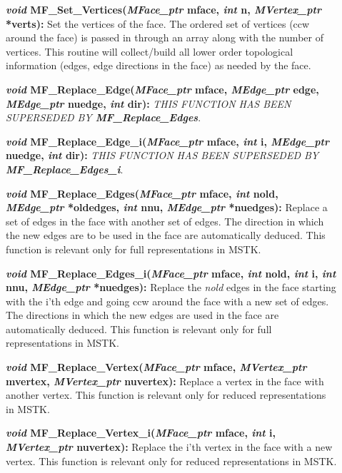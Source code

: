 \documentclass[12pt]{article}
\begin{document}
\begin{description}
\item[]\textbf{\textit{void} MF\_Set\_Vertices(\textit{MFace\_ptr}
    mface, \textit{int} n, \textit{MVertex\_ptr} *verts):} Set the
  vertices of the face. The ordered set of vertices (ccw around the
  face) is passed in through an array along with the number of
  vertices. This routine will collect/build all lower order
  topological information (edges, edge directions in the face) as needed by the face.
  
\item[]\textbf{\textit{void} MF\_Replace\_Edge(\textit{MFace\_ptr}
    mface, \textit{MEdge\_ptr} edge, \textit{MEdge\_ptr} nuedge,
    \textit{int} dir):} \textit{THIS FUNCTION HAS BEEN SUPERSEDED BY
    \textbf{MF\_Replace\_Edges}}.
  
\item[]\textbf{\textit{void} MF\_Replace\_Edge\_i(\textit{MFace\_ptr}
    mface, \textit{int} i, \textit{MEdge\_ptr} nuedge, \textit{int}
    dir):} \textit{THIS FUNCTION HAS BEEN SUPERSEDED BY
    \textbf{MF\_Replace\_Edges\_i}}.
  
\item[]\textbf{\textit{void} MF\_Replace\_Edges(\textit{MFace\_ptr}
    mface, \textit{int} nold, \textit{MEdge\_ptr} *oldedges,
    \textit{int} nnu, \textit{MEdge\_ptr} *nuedges):} Replace a set of
  edges in the face with another set of edges. The direction in which
  the new edges are to be used in the face are automatically deduced.
  This function is relevant only for full representations in MSTK.
  
\item[]\textbf{\textit{void} MF\_Replace\_Edges\_i(\textit{MFace\_ptr}
    mface, \textit{int} nold, \textit{int} i, \textit{int} nnu,
    \textit{MEdge\_ptr} *nuedges):} Replace the \textit{nold} edges in
  the face starting with the i'th edge and going ccw around the face
  with a new set of edges. The directions in which the new edges are
  used in the face are automatically deduced. This function is
  relevant only for full representations in MSTK.

\item[]\textbf{\textit{void} MF\_Replace\_Vertex(\textit{MFace\_ptr} mface,
\textit{MVertex\_ptr} mvertex, \textit{MVertex\_ptr} nuvertex):}
Replace a vertex in the face with another vertex. This function is
relevant only for reduced representations in MSTK.

\item[]\textbf{\textit{void} MF\_Replace\_Vertex\_i(\textit{MFace\_ptr}
mface, \textit{int} i, \textit{MVertex\_ptr} nuvertex):} Replace the
i'th vertex in the face with a new vertex. This function is relevant
only for reduced representations in MSTK.


\end{description}
\end{document}
